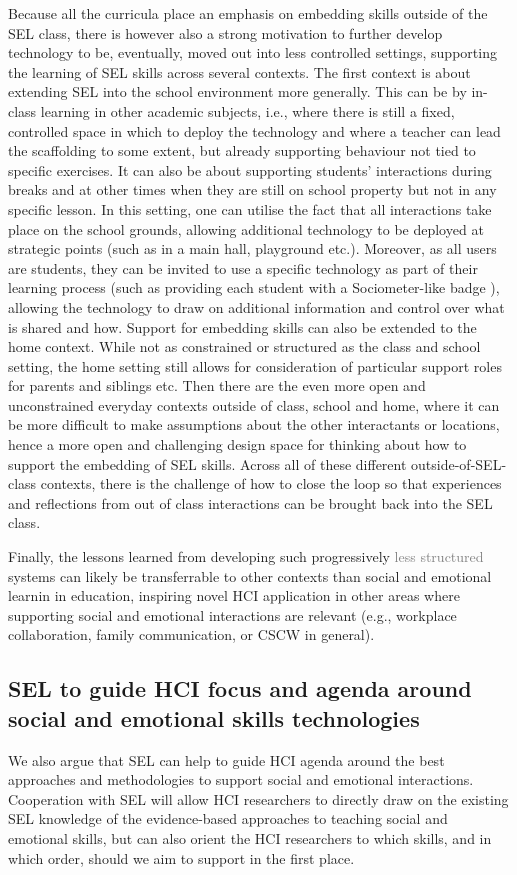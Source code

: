 \documentclass[prodmode,acmtochi]{acmsmall}
\newcommand{\rephrase}[1]{\textrm{\textrm{\textcolor{gray}{#1}}}}
\begin{document}
Because all the curricula place an emphasis on embedding skills outside of the SEL class, there is however also a strong motivation to further develop technology to be, eventually, moved out into less controlled settings,  supporting the learning of SEL skills across several contexts. The first context is about extending SEL into the school environment more generally. This can be by in-class learning in other academic subjects, i.e., where there is still a fixed, controlled space in which to deploy the technology and where a teacher can lead the scaffolding to some extent, but already supporting behaviour not tied to specific exercises. It can also be about supporting students' interactions during breaks and at other times when they are still on school property but not in any specific lesson. In this setting, one can utilise the fact that all interactions take place on the school grounds, allowing additional technology to be deployed at strategic points (such as in a main hall, playground etc.). Moreover, as all users are students, they can be invited to use a specific technology as part of their learning process (such as providing each student with a Sociometer-like badge \cite{Kim2008}), allowing the technology to draw on additional information and control over what is shared and how. 
%
Support for embedding skills can also be extended to the home context. While not as constrained or structured as the class and school setting, the home setting still allows for consideration of particular support roles for parents and siblings etc. Then there are the even more open and unconstrained everyday contexts outside of class, school and home, where it can be more difficult to make assumptions about the other interactants or locations, hence a more open and challenging design space for thinking about how to support the embedding of SEL skills. Across all of these different outside-of-SEL-class contexts, there is the challenge of how to close the loop so that experiences and reflections from out of class interactions can be brought back into the SEL class.

Finally, the lessons learned from developing such progressively \rephrase{less structured} systems can likely be transferrable to other contexts than social and emotional learnin in education, inspiring novel HCI application in other areas where supporting social and emotional interactions are relevant (e.g., workplace collaboration, family communication, or CSCW in general).
%


\subsection{SEL to guide HCI focus and agenda around social and emotional skills technologies }
We also argue that SEL can help to guide HCI agenda around the best approaches and methodologies to support social and emotional interactions. Cooperation with SEL will allow HCI researchers to directly draw on the existing SEL knowledge of the evidence-based approaches to teaching social and emotional skills, but can also orient the HCI researchers to which skills, and in which order, should we aim to support in the first place. 
\end{document}
